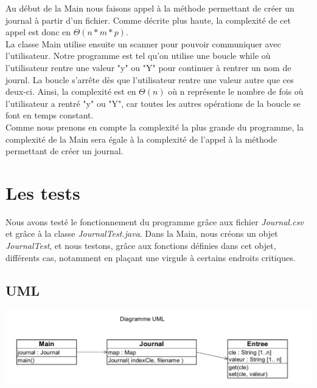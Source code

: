 \documentclass[a4paper]{article}
\begin{document}
Au début de la Main nous faisons appel à la méthode permettant de créer un journal à partir d'un fichier. Comme décrite plus haute, la complexité de cet appel est donc en $\Theta(n*m*p)$. 
\\
La classe Main utilise ensuite un scanner pour pouvoir communiquer avec l'utilisateur. Notre programme est tel qu'on utilise une boucle while où l'utilisateur rentre une valeur "y" ou "Y" pour continuer à rentrer un nom de journl. La boucle s'arrête dès que l'utilisateur rentre une valeur autre que ces deux-ci. Ainsi, la complexité est en $\Theta(n)$ où n représente le nombre de fois où l'utilisateur a rentré "y" ou "Y", car toutes les autres opérations de la boucle se font en temps constant. 
\\
Comme nous prenons en compte la complexité la plus grande du programme, la complexité de la Main sera égale à la complexité de l'appel à la méthode permettant de créer un journal. 
\\
\section*{Les tests}

Nous avons testé le fonctionnement du programme grâce aux fichier \textit{Journal.csv} et grâce à la classe \textit{JournalTest.java}. Dans la Main, nous créons un objet \textit{JournalTest}, et nous testons, grâce aux fonctions définies dans cet objet, différents cas, notamment en plaçant une virgule à certains endroits critiques.


\subsection*{UML}
\centering
\includegraphics[scale=0.4]{DiagrammeUML.pdf}
\end{document}
